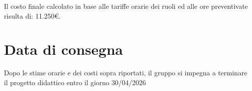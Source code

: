 \documentclass{article}
\begin{document}
	Il costo finale calcolato in base alle tariffe orarie dei ruoli ed alle ore preventivate risulta di: 11.250€.
	
	\section{Data di consegna}
	Dopo le stime orarie e dei costi sopra riportati, il gruppo si impegna a terminare il progetto didattico entro il giorno 30/04/2026
	
	
	
\end{document}
